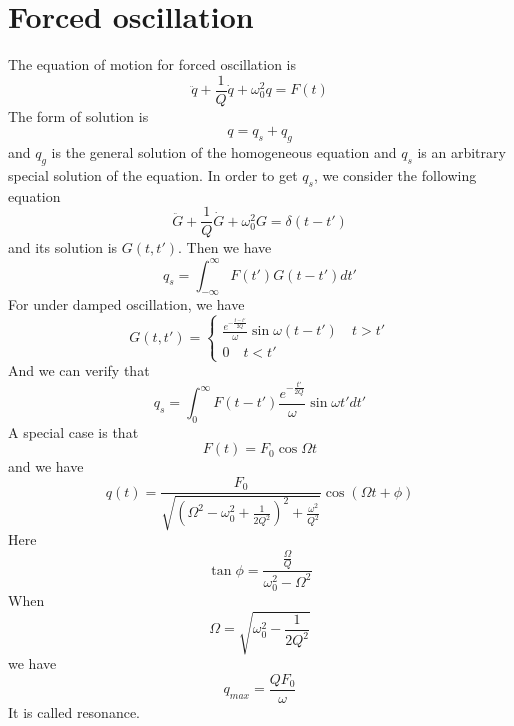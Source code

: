 \section{Forced oscillation}
The equation of motion for forced oscillation is
\[\ddot{q} + \frac{1}{Q}\dot{q} + \omega_0^2 q = F(t)\]
The form of solution is
\[q = q_s + q_g\]
and $q_g$ is the general solution of the homogeneous equation and $q_s$ is an arbitrary special solution of the equation. In order to get $q_s$, we consider the following equation
\[\ddot{G} + \frac{1}{Q}\dot{G} + \omega_0^2 G = \delta(t-t')\]
and its solution is $G(t,t')$.
Then we have
\[q_s = \int_{-\infty}^{\infty} F(t')G(t-t')dt'\]
For under damped oscillation, we have
\[G(t,t') = \begin{cases} \frac{e^{-\frac{t-t'}{2Q}}}{\omega} \sin\omega(t-t') \quad t>t'\\ 0 \quad t<t'\end{cases} \]
And we can verify that
\[q_s = \int_{0}^{\infty} F(t-t') \frac{e^{-\frac{t'}{2Q}}}{\omega} \sin\omega t' dt'\]
A special case is that
\[F(t) = F_0 \cos\Omega t\]
and we have
\[q(t) = \frac{F_0}{\sqrt{(\Omega^2 - \omega_0^2 + \frac{1}{2Q^2})^2 + \frac{\omega^2}{Q^2}}} \cos(\Omega t + \phi)\]
Here
\[\tan \phi = \frac{\frac{\Omega}{Q}}{\omega_0^2 - \Omega^2}\]
When
\[\Omega = \sqrt{\omega_0^2 - \frac{1}{2Q^2}}\]
we have
\[q_{max} = \frac{QF_0}{\omega}\]
It is called resonance. 

